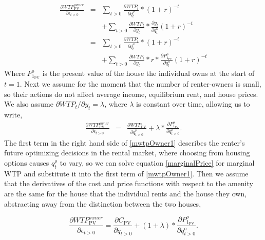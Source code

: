 \documentclass[ecta,nameyear,draft]{econsocart}
\theoremstyle{plain}
\theoremstyle{remark}
\begin{document}
\begin{eqnarray}
	\frac{\partial \mathit{WTP}^{\mathit{owner}}_{\mathrm{PV}}}{\partial \epsilon_{t>0}}&=&\sum_{t>0}\frac{\partial \mathit{WTP}_t}{\partial q^\rho_t}*(1+r)^{-t} \nonumber\\
	&& +\sum_{t>0}\frac{\partial \mathit{WTP}_t}{\partial y_t}*\frac{\partial y_t}{\partial q_t^o}(1+r)^{-t} \nonumber\\
	&=&\sum_{t>0}\frac{\partial \mathit{WTP}_t}{\partial q_t^\rho}*(1+r)^{-t}\nonumber\\
	&& +\sum_{t>0}\frac{\partial \mathit{WTP}_t}{\partial y_t}*r*\frac{\partial P^o_{1_\mathrm{PV}}}{\partial q_t^o}(1+r)^{-t} \label{mwtpOwner0}
\end{eqnarray}
Where $P^o_{1_\mathrm{PV}}$ is the present value of the house the individual owns at the start of $t=1$. Next we assume for the moment that the number of renter-owners is small, so their actions do not affect average income, equilibrium rent, and house prices. We also assume $\partial \mathit{WTP}_t/\partial y_t=\lambda$, where $\lambda$ is constant over time, allowing us to write,
\begin{eqnarray}
	\frac{\partial \mathit{WTP}^{\mathit{owner}}_{\mathrm{PV}}}{\partial \epsilon_{t>0}} 
	&=&\frac{\partial \mathit{WTP_{\mathrm{PV}}}}{\partial q^\rho_{t>0}} + \lambda*\frac{\partial P^o_{1_\mathrm{PV}}}{\partial q_{t>0}^o} \label{mwtpOwner1}.
\end{eqnarray}
The first term in the right hand side of \ref{mwtpOwner1} describes the renter's future optimizing decisions in the rental market, where choosing from housing options causes $q_t^\rho$ to vary, so we can solve equation \ref{marginalPrice} for marginal WTP and substitute it into the first term of \ref{mwtpOwner1}. Then we assume that the derivatives of the cost and price functions with respect to the amenity are the same for the house that the individual rents and the house they own, abstracting away from the distinction between the two houses, 

\begin{equation}
	\frac{\partial \mathit{WTP}^{\mathit{owner}}_{\mathrm{PV}}}{\partial \epsilon_{t>0}} =	\frac{\partial C_{\mathrm{PV}}}{\partial q_{t>0}}+(1+\lambda)*\frac{\partial P^o_{1_\mathrm{PV}}}{\partial q_{t>0}^o}.
\end{equation}
\end{document}
